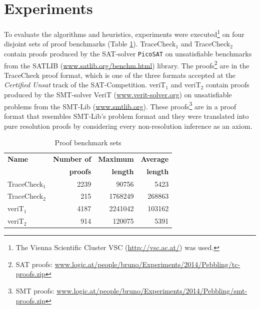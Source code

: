 \section{Experiments} 
\label{sec:experiments}

To evaluate the algorithms and heuristics, experiments were executed\footnote{The Vienna Scientific Cluster VSC 
(\url{http://vsc.ac.at/}) was used.} on four disjoint sets of proof benchmarks (Table \ref{tab:benchmarks}). 
TraceCheck$_1$ and TraceCheck$_2$ contain proofs produced by the SAT-solver \texttt{PicoSAT} \cite{Biere2008} on unsatisfiable benchmarks from the SATLIB (\url{www.satlib.org/benchm.html}) library. 
The proofs\footnote{SAT proofs: \url{www.logic.at/people/bruno/Experiments/2014/Pebbling/tc-proofs.zip}} are in the TraceCheck proof format, which is one of the three formats accepted at the \emph{Certified Unsat} track of the SAT-Competition.
veriT$_1$ and veriT$_2$ contain proofs produced by the SMT-solver VeriT (\url{www.verit-solver.org}) on unsatisfiable problems from the SMT-Lib (\url{www.smtlib.org}). 
These proofs\footnote{SMT proofs: \url{www.logic.at/people/bruno/Experiments/2014/Pebbling/smt-proofs.zip}} are in a proof format that resembles SMT-Lib's problem format and they were translated into pure resolution proofs by considering every non-resolution inference as an axiom.


\begin{table}[tb]
	\centering
	\setlength{\tabcolsep}{8pt}
	\begin{tabular}{lrrr}
		\toprule
		\textbf{Name} & \textbf{Number of} & \textbf{Maximum} & \textbf{Average} \\ 
		              & \textbf{proofs}    & \textbf{length}  & \textbf{length} \\
		\midrule
		TraceCheck$_1$ & 2239 & 90756   & 5423   \\
		TraceCheck$_2$ & 215	& 1768249 & 268863 \\
    veriT$_1$ & 4187 & 2241042 & 103162 \\
    veriT$_2$ & 914  & 120075  & 5391  \\ 
		\bottomrule   
	\end{tabular}
	\caption{Proof benchmark sets}
	\label{tab:benchmarks}
\end{table}

